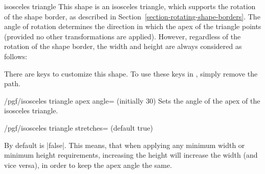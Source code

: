 \begin{shape}{isosceles triangle}
  This shape is an isosceles triangle, which supports the rotation of
  the shape border, as described in
  Section~\ref{section-rotating-shape-borders}. The angle of rotation
  determines the direction in which the apex of the triangle points
  (provided no other transformations are applied). However, regardless
  of the rotation of the shape border, the width and height are
  always considered as follows:
	
\begin{codeexample}[]
\end{codeexample}

	There are \pgfname{} keys to customize this shape.
	To use these keys in \tikzname, simply remove the 
	path.

  \begin{key}{/pgf/isosceles triangle apex angle= (initially 30)}
    Sets the angle of the apex of the isosceles triangle.
  \end{key}

\begin{key}{/pgf/isosceles triangle stretches= (default true)}

	By default  is |false|. This means, that when applying
	any minimum width or minimum height requirements, increasing the
	height will increase the width (and	vice versa), in order to keep the
	apex angle the same.

\begin{codeexample}[]
\end{codeexample}	


\end{key}
\end{shape}
